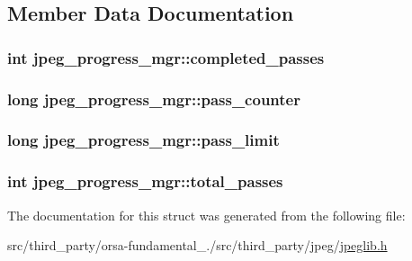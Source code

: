 \subsection{Member Data Documentation}
\hypertarget{structjpeg__progress__mgr_a0cf4c1c84b2662763053e0eeaca417f3}{}
\subsubsection[{completed\+\_\+passes}]{\setlength{\rightskip}{0pt plus 5cm}int jpeg\+\_\+progress\+\_\+mgr\+::completed\+\_\+passes}\label{structjpeg__progress__mgr_a0cf4c1c84b2662763053e0eeaca417f3}
\hypertarget{structjpeg__progress__mgr_ae52d1c89154d3f15ea44f96ee1c4ea7f}{}
\subsubsection[{pass\+\_\+counter}]{\setlength{\rightskip}{0pt plus 5cm}long jpeg\+\_\+progress\+\_\+mgr\+::pass\+\_\+counter}\label{structjpeg__progress__mgr_ae52d1c89154d3f15ea44f96ee1c4ea7f}
\hypertarget{structjpeg__progress__mgr_a68ec6ba74838f7b2b8ded8d4c8254c1d}{}
\subsubsection[{pass\+\_\+limit}]{\setlength{\rightskip}{0pt plus 5cm}long jpeg\+\_\+progress\+\_\+mgr\+::pass\+\_\+limit}\label{structjpeg__progress__mgr_a68ec6ba74838f7b2b8ded8d4c8254c1d}
\hypertarget{structjpeg__progress__mgr_a35d61747861f284526a9b312b3dc59ca}{}
\subsubsection[{total\+\_\+passes}]{\setlength{\rightskip}{0pt plus 5cm}int jpeg\+\_\+progress\+\_\+mgr\+::total\+\_\+passes}\label{structjpeg__progress__mgr_a35d61747861f284526a9b312b3dc59ca}


The documentation for this struct was generated from the following file\+:\begin{DoxyCompactItemize}
\item 
src/third\+\_\+party/orsa-\/fundamental\+\_./src/third\+\_\+party/jpeg/\hyperlink{jpeglib_8h}{jpeglib.\+h}\end{DoxyCompactItemize}
